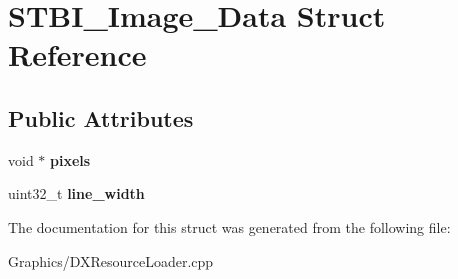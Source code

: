\hypertarget{structSTBI__Image__Data}{}\section{S\+T\+B\+I\+\_\+\+Image\+\_\+\+Data Struct Reference}
\label{structSTBI__Image__Data}
\subsection*{Public Attributes}
\begin{DoxyCompactItemize}
\item 
\mbox{\label{structSTBI__Image__Data_aacb732a4f387518ea9d651cc7d68639a}} 
void $\ast$ {\bfseries pixels}
\item 
\mbox{\label{structSTBI__Image__Data_a8d95e72e14b637b41936f9b18dee28d6}} 
uint32\+\_\+t {\bfseries line\+\_\+width}
\end{DoxyCompactItemize}


The documentation for this struct was generated from the following file\+:\begin{DoxyCompactItemize}
\item 
Graphics/D\+X\+Resource\+Loader.\+cpp\end{DoxyCompactItemize}

